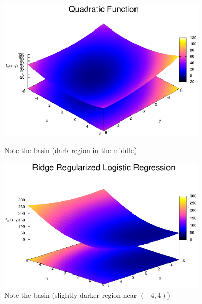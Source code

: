 \documentclass{article}
\begin{document}
\begin{flushleft}
\begin{figure}[H]
\begin{minipage}{0.45\linewidth}
\centering
\includegraphics[width=0.9\textwidth]{./images/quadratic_function}
\caption{Note the basin (dark region in the middle)}
\end{minipage}
\hfill
\begin{minipage}{0.45\linewidth}
\centering
\includegraphics[width=0.9\textwidth]{./images/ridge_regularized_logistic_regression}
\caption{Note the basin (slightly darker region near \((-4, 4)\))}
\end{minipage}
\end{figure}


\end{flushleft}
\end{document}
